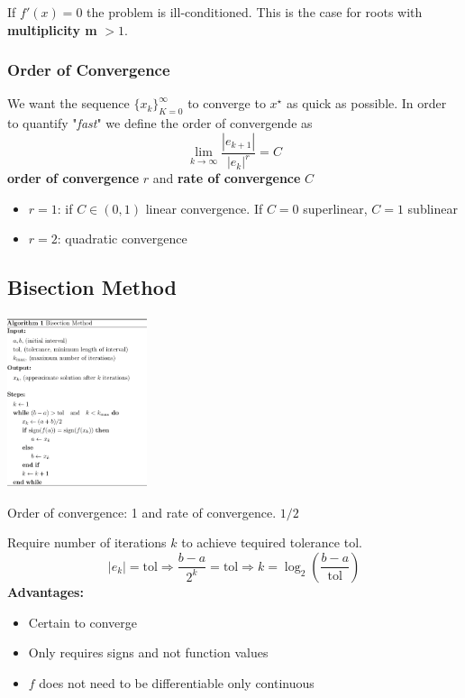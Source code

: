         If $f'(x)=0$ the problem is ill-conditioned. This is the case for roots with \textbf{multiplicity m} $> 1$.
        
        \subsubsection{Order of Convergence}
            We want the sequence $\{x_k\}_{K=0}^{\infty}$ to converge to $x^\star$ as quick as possible. In order to quantify "\textit{fast}" we define the order of convergende as
            \begin{equation*}
                \lim_{k\to\infty}\frac{|e_{k+1}|}{|e_k|^r}= C
            \end{equation*}
            \textbf{order of convergence} $r$ and \textbf{rate of convergence} $C$
            \begin{itemize}
                \item $r=1$: if $C\in(0,1)$ linear convergence. If $C = 0$ superlinear, $C = 1$ sublinear
                \item $r=2$: quadratic convergence
            \end{itemize}{}

\subsection{Bisection Method}
    \begin{center}
        \includegraphics[width=0.9\linewidth, height = 50mm]{images/02/bisection.jpg}
    \end{center}
    Order of convergence: 1 and rate of convergence. $1/2$
    
    Require number of iterations $k$ to achieve tequired tolerance tol.
    \begin{equation*}
        |e_k| = \textrm{tol} \Rightarrow \frac{b-a}{2^k}=\textrm{tol} \Rightarrow k = \log_2\left(\frac{b-a}{\textrm{tol}}\right)
    \end{equation*}
    \textbf{Advantages:}
    \begin{itemize}
        \item Certain to converge
        \item Only requires signs and not function values
        \item $f$ does not need to be differentiable only continuous
    \end{itemize}
    
